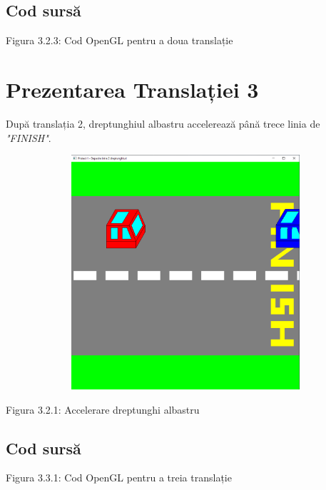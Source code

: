 \documentclass[12pt]{report}
\begin{document}
    \subsection{Cod sursă}
    
    \begin{center}
        Figura 3.2.3: Cod OpenGL pentru a doua translație
    \end{center}

    \newpage
    \section{Prezentarea Translației 3}
    După translația 2, dreptunghiul albastru accelerează până trece linia de \emph{"FINISH"}.
    \begin{center}
        \includegraphics[width=15cm, height=8.7cm]{Poza10.png}
    \end{center}
    \begin{center}
        Figura 3.2.1: Accelerare dreptunghi albastru
    \end{center}

    \subsection{Cod sursă}
    
    \begin{center}
        Figura 3.3.1: Cod OpenGL pentru a treia translație
    \end{center}
\end{document}
